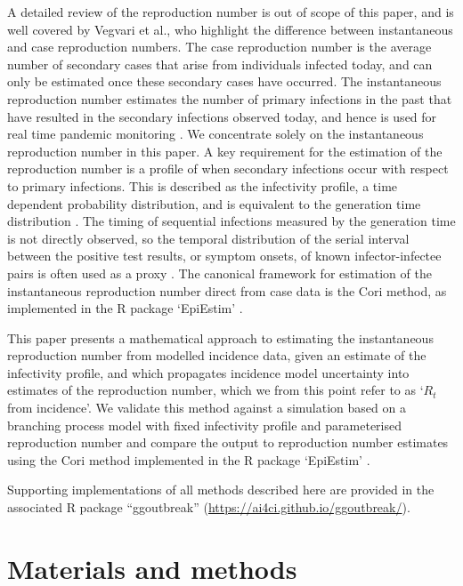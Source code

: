 \documentclass[10pt,letterpaper]{article}
\begin{document}
A detailed review of the reproduction number is out of scope of this paper, and is well covered by Vegvari et al.\cite{vegvari2022}, who highlight the difference between instantaneous and case reproduction numbers. The case reproduction number is the average number of secondary cases that arise from individuals infected today, and can only be estimated once these secondary cases have occurred. The instantaneous reproduction number estimates the number of primary infections in the past that have resulted in the secondary infections observed today, and hence is used for real time pandemic monitoring \cite{gostic2020}. We concentrate solely on the instantaneous reproduction number in this paper. A key requirement for the estimation of the reproduction number is a profile of when secondary infections occur with respect to primary infections. This is described as the infectivity profile, a time dependent probability distribution, and is equivalent to the generation time distribution \cite{gostic2020,park2021}. The timing of sequential infections measured by the generation time is not directly observed, so the temporal distribution of the serial interval between the positive test results, or symptom onsets, of known infector-infectee pairs is often used as a proxy \cite{park2021, thompson2019}. The canonical framework for estimation of the instantaneous reproduction number direct from case data is the Cori method, as implemented in the R package `EpiEstim' \cite{thompson2019}.

This paper presents a mathematical approach to estimating the instantaneous reproduction number from modelled incidence data, given an estimate of the infectivity profile, and which propagates incidence model uncertainty into estimates of the reproduction number, which we from this point refer to as `$R_t$ from incidence'. We validate this method against a simulation based on a branching process model with fixed infectivity profile and parameterised reproduction number and compare the output to reproduction number estimates using the Cori method implemented in the R package `EpiEstim' \cite{thompson2019}.

Supporting implementations of all methods described here are provided in the associated R package ``ggoutbreak'' (\url{https://ai4ci.github.io/ggoutbreak/}).

\section*{Materials and methods}
\end{document}
